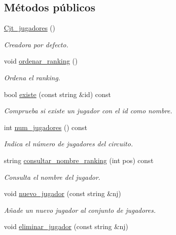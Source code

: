 \subsection*{Métodos públicos}
\begin{DoxyCompactItemize}
\item 
\hyperlink{class_cjt__jugadores_af40661f610000ab6febf3ea0de7a451b}{Cjt\+\_\+jugadores} ()
\begin{DoxyCompactList}\small\item\em Creadora por defecto. \end{DoxyCompactList}\item 
void \hyperlink{class_cjt__jugadores_a61d4c0806dcd9973fe8da0af7d39d672}{ordenar\+\_\+ranking} ()
\begin{DoxyCompactList}\small\item\em Ordena el ranking. \end{DoxyCompactList}\item 
bool \hyperlink{class_cjt__jugadores_abc6937363d137e38ab7545c5f6ec7f10}{existe} (const string \&id) const
\begin{DoxyCompactList}\small\item\em Comprueba si existe un jugador con el id como nombre. \end{DoxyCompactList}\item 
int \hyperlink{class_cjt__jugadores_a4951d7691e67c44415fdcb3119dd4148}{num\+\_\+jugadores} () const
\begin{DoxyCompactList}\small\item\em Indica el número de jugadores del circuito. \end{DoxyCompactList}\item 
string \hyperlink{class_cjt__jugadores_ad8d836a5be49a639ffed71a643080d53}{consultar\+\_\+nombre\+\_\+ranking} (int pos) const
\begin{DoxyCompactList}\small\item\em Consulta el nombre del jugador. \end{DoxyCompactList}\item 
void \hyperlink{class_cjt__jugadores_a23468af9b07a692a3036a1bf5a128232}{nuevo\+\_\+jugador} (const string \&nj)
\begin{DoxyCompactList}\small\item\em Añade un nuevo jugador al conjunto de jugadores. \end{DoxyCompactList}\item 
void \hyperlink{class_cjt__jugadores_ab0bba7a90bea0c07c219531985746bcb}{eliminar\+\_\+jugador} (const string \&nj)

\end{DoxyCompactItemize}
